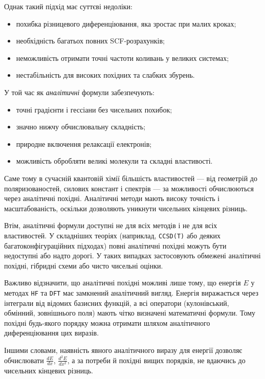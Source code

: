 Однак такий підхід має суттєві недоліки:

\begin{itemize}
	\item похибка різницевого диференціювання, яка зростає при малих кроках;
	\item необхідність багатьох повних SCF-розрахунків;
	\item неможливість отримати точні частоти коливань у великих системах;
	\item нестабільність для високих похідних та слабких збурень.
\end{itemize}

У той час як \emph{аналітичні} формули забезпечують:
\begin{itemize}
	\item точні градієнти і гессіани без чисельних похибок;
	\item значно нижчу обчислювальну складність;
	\item природне включення релаксації електронів;
	\item можливість обробляти великі молекули та складні властивості.
\end{itemize}

Саме тому в сучасній квантовій хімії більшість властивостей ---
від геометрій до поляризованостей, силових констант і спектрів ---
за можливості обчислюються через аналітичні похідні.
Аналітичні методи мають високу точність і масштабованість,
оскільки дозволяють уникнути чисельних кінцевих різниць.

Втім, аналітичні формули доступні не для всіх методів і не для всіх
властивостей. У складніших теоріях (наприклад, \texttt{CCSD(T)} або
деяких багатоконфігураційних підходах) повні аналітичні похідні можуть
бути недоступні або надто дорогі.
У таких випадках застосовують обмежені аналітичні похідні, гібридні
схеми або чисто чисельні оцінки.


Важливо відзначити, що аналітичні похідні можливі лише тому, що
енергія $E$ у методах \texttt{HF} та \texttt{DFT} має
замкнений аналітичний вигляд.
Енергія виражається через інтеграли від відомих базисних функцій,
а всі оператори (кулонівський, обмінний, зовнішнього поля) мають
чітко визначені математичні формули.
Тому похідні будь-якого порядку можна отримати шляхом
аналітичного диференціювання цих виразів.

Іншими словами,
наявність явного аналітичного виразу для енергії дозволяє
обчислювати $\frac{dE}{dx}$, $\frac{d^2E}{dx^2}$,
а за потреби й похідні вищих порядків,
не вдаючись до чисельних кінцевих різниць.


